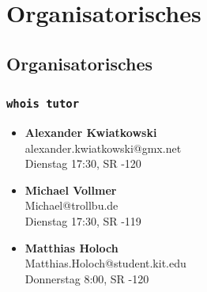 

\section{Organisatorisches}

\subsection{Organisatorisches}

\begin{frame}
	\frametitle{\texttt{whois tutor}}
	
	\begin{itemize}
		\item \textbf{Alexander Kwiatkowski} \\ alexander.kwiatkowski@gmx.net \\ Dienstag 17:30, SR -120
		\item \textbf{Michael Vollmer} \\ Michael@trollbu.de \\ Dienstag 17:30, SR -119
		\item \textbf{Matthias Holoch} \\ Matthias.Holoch@student.kit.edu \\ Donnerstag 8:00, SR -120
	\end{itemize}
\end{frame}

